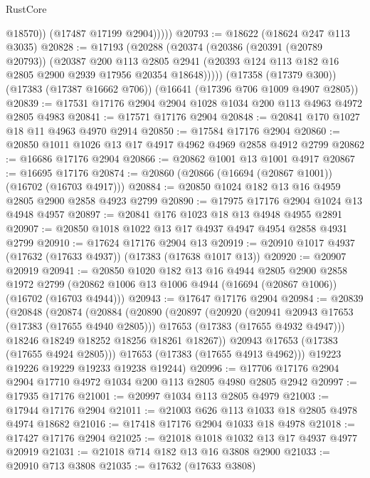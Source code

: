 \begin{lexlean}{RustCore}
\begin{coremodule}
                @18570))
            (@17487 @17199 @2904)))))
@20793 := @18622 (@18624 @247 @113 @3035)
@20828 := @17193
    (@20288
      (@20374
        (@20386
          (@20391 (@20789 @20793))
          (@20387
            @200
            @113
            @2805
            @2941
            (@20393 @124 @113 @182 @16 @2805 @2900 @2939 @17956 @20354 @18648)))))
    (@17358 (@17379 @300))
    (@17383 (@17387 @16662 @706))
    (@16641 (@17396 @706 @1009 @4907 @2805))
@20839 := @17531 @17176 @2904 @2904 @1028 @1034 @200 @113 @4963 @4972 @2805 @4983
@20841 := @17571 @17176 @2904
@20848 := @20841 @170 @1027 @18 @11 @4963 @4970 @2914
@20850 := @17584 @17176 @2904
@20860 := @20850 @1011 @1026 @13 @17 @4917 @4962 @4969 @2858 @4912 @2799
@20862 := @16686 @17176 @2904
@20866 := @20862 @1001 @13 @1001 @4917
@20867 := @16695 @17176
@20874 := @20860 (@20866 (@16694 (@20867 @1001)) (@16702 (@16703 @4917)))
@20884 := @20850 @1024 @182 @13 @16 @4959 @2805 @2900 @2858 @4923 @2799
@20890 := @17975 @17176 @2904 @1024 @13 @4948 @4957
@20897 := @20841 @176 @1023 @18 @13 @4948 @4955 @2891
@20907 := @20850 @1018 @1022 @13 @17 @4937 @4947 @4954 @2858 @4931 @2799
@20910 := @17624 @17176 @2904 @13
@20919 := @20910 @1017 @4937 (@17632 (@17633 @4937)) (@17383 (@17638 @1017 @13))
@20920 := @20907 @20919
@20941 := @20850
    @1020
    @182
    @13
    @16
    @4944
    @2805
    @2900
    @2858
    @1972
    @2799
    (@20862 @1006 @13 @1006 @4944 (@16694 (@20867 @1006)) (@16702 (@16703 @4944)))
@20943 := @17647 @17176 @2904
@20984 := @20839
    (@20848
      (@20874
        (@20884
          (@20890
            (@20897
              (@20920
                (@20941 @20943 @17653 (@17383 (@17655 @4940 @2805)))
                @17653
                (@17383 (@17655 @4932 @4947)))
              @18246
              @18249
              @18252
              @18256
              @18261
              @18267))
          @20943
          @17653
          (@17383 (@17655 @4924 @2805)))
        @17653
        (@17383 (@17655 @4913 @4962)))
      @19223
      @19226
      @19229
      @19233
      @19238
      @19244)
@20996 := @17706 @17176 @2904 @2904 @17710 @4972 @1034 @200 @113 @2805 @4980 @2805 @2942
@20997 := @17935 @17176
@21001 := @20997 @1034 @113 @2805 @4979
@21003 := @17944 @17176 @2904
@21011 := @21003 @626 @113 @1033 @18 @2805 @4978 @4974 @18682
@21016 := @17418 @17176 @2904 @1033 @18 @4978
@21018 := @17427 @17176 @2904
@21025 := @21018 @1018 @1032 @13 @17 @4937 @4977 @20919
@21031 := @21018 @714 @182 @13 @16 @3808 @2900
@21033 := @20910 @713 @3808
@21035 := @17632 (@17633 @3808)

\end{coremodule}
\end{lexlean}
